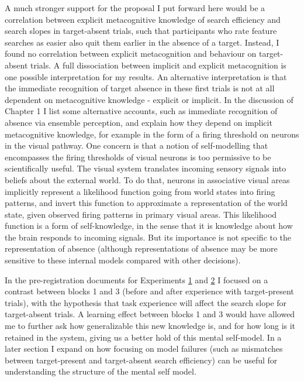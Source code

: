 \documentclass[12pt,twoside]{reedthesis}
\begin{document}
A much stronger support for the proposal I put forward here would be a correlation between explicit metacognitive knowledge of search efficiency and search slopes in target-absent trials, such that participants who rate feature searches as easier also quit them earlier in the absence of a target. Instead, I found no correlation between explicit metacognition and behaviour on target-absent trials. A full dissociation between implicit and explicit metacognition is one possible interpretation for my results. An alternative interpretation is that the immediate recognition of target absence in these first trials is not at all dependent on metacognitive knowledge - explicit or implicit.
In the discussion of Chapter 1 I list some alternative accounts, such as immediate recognition of absence via ensemble perception, and explain how they depend on implicit metacognitive knowledge, for example in the form of a firing threshold on neurons in the visual pathway. One concern is that a notion of self-modelling that encompasses the firing thresholds of visual neurons is too permissive to be scientifically useful. The visual system translates incoming sensory signals into beliefs about the external world. To do that, neurons in associative visual areas implicitly represent a likelihood function going from world states into firing patterns, and invert this function to approximate a representation of the world state, given observed firing patterns in primary visual areas. This likelihood function is a form of self-knowledge, in the sense that it is knowledge about how the brain responds to incoming signals. But its importance is not specific to the representation of absence (although representations of absence may be more sensitive to these internal models compared with other decisions).

In the pre-registration documents for Experiments \href{https://osf.io/ea385}{1} and \href{https://osf.io/v6mnb}{2} I focused on a contrast between blocks 1 and 3 (before and after experience with target-present trials), with the hypothesis that task experience will affect the search slope for target-absent trials. A learning effect between blocks 1 and 3 would have allowed me to further ask how generalizable this new knowledge is, and for how long is it retained in the system, giving us a better hold of this mental self-model. In a later section I expand on how focusing on model failures (such as mismatches between target-present and target-absent search efficiency) can be useful for understanding the structure of the mental self model.
\end{document}
